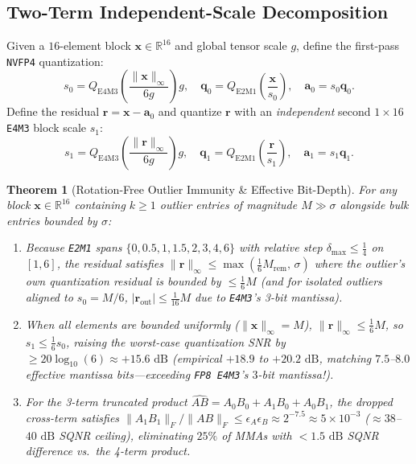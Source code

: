 \documentclass[conference,10pt]{IEEEtran}
\newtheorem{theorem}{Theorem}
\begin{document}
\subsection{Two-Term Independent-Scale Decomposition}
Given a $16$-element block $\mathbf{x} \in \mathbb{R}^{16}$ and global tensor scale $g$, define the first-pass \texttt{NVFP4} quantization:
\begin{equation}
s_0 = Q_{\text{E4M3}}\!\left(\frac{\|\mathbf{x}\|_\infty}{6 g}\right) g, \quad \mathbf{q}_0 = Q_{\text{E2M1}}\!\left(\frac{\mathbf{x}}{s_0}\right), \quad \mathbf{a}_0 = s_0 \mathbf{q}_0.
\end{equation}
Define the residual $\mathbf{r} = \mathbf{x} - \mathbf{a}_0$ and quantize $\mathbf{r}$ with an \emph{independent} second $1{\times}16$ \texttt{E4M3} block scale $s_1$:
\begin{equation}
s_1 = Q_{\text{E4M3}}\!\left(\frac{\|\mathbf{r}\|_\infty}{6 g}\right) g, \quad \mathbf{q}_1 = Q_{\text{E2M1}}\!\left(\frac{\mathbf{r}}{s_1}\right), \quad \mathbf{a}_1 = s_1 \mathbf{q}_1.
\end{equation}

\begin{theorem}[Rotation-Free Outlier Immunity \& Effective Bit-Depth]
For any block $\mathbf{x} \in \mathbb{R}^{16}$ containing $k \ge 1$ outlier entries of magnitude $M \gg \sigma$ alongside bulk entries bounded by $\sigma$:
\begin{enumerate}
    \item Because \texttt{E2M1} spans $\{0, 0.5, 1, 1.5, 2, 3, 4, 6\}$ with relative step $\delta_{\max} \le \frac{1}{4}$ on $[1,6]$, the residual satisfies $\|\mathbf{r}\|_\infty \le \max\!\left(\frac{1}{6} M_{\text{rem}},\, \sigma\right)$ where the outlier's own quantization residual is bounded by $\le \frac{1}{6} M$ (and for isolated outliers aligned to $s_0 = M/6$, $|\mathbf{r}_{\text{out}}| \le \frac{1}{16} M$ due to \texttt{E4M3}'s 3-bit mantissa).
    \item When all elements are bounded uniformly ($\|\mathbf{x}\|_\infty = M$), $\|\mathbf{r}\|_\infty \le \frac{1}{6} M$, so $s_1 \le \frac{1}{6} s_0$, raising the worst-case quantization SNR by $\ge 20 \log_{10}(6) \approx +15.6\text{ dB}$ (empirical $+18.9$ to $+20.2\text{ dB}$, matching $7.5$--$8.0$ effective mantissa bits---exceeding \texttt{FP8 E4M3}'s $3$-bit mantissa!).
    \item For the 3-term truncated product $\widehat{AB} = A_0 B_0 + A_1 B_0 + A_0 B_1$, the dropped cross-term satisfies $\|A_1 B_1\|_F / \|A B\|_F \le \epsilon_A \epsilon_B \approx 2^{-7.5} \approx 5\times 10^{-3}$ ($\approx 38$--$40\text{ dB}$ SQNR ceiling), eliminating $25\%$ of MMAs with $<1.5\text{ dB}$ SQNR difference vs.\ the 4-term product.
\end{enumerate}
\end{theorem}
\end{document}

